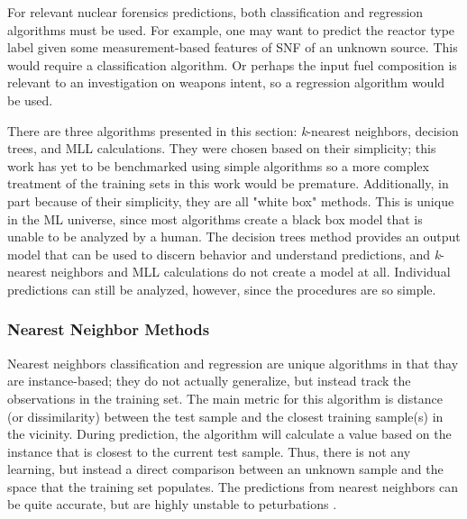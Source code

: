 \setlength\abovedisplayskip{2.5pt}

For relevant nuclear forensics predictions, both classification and regression
algorithms must be used.  For example, one may want to predict the reactor type
label given some measurement-based features of \gls{SNF} of an unknown source.
This would require a classification algorithm. Or perhaps the input fuel
composition is relevant to an investigation on weapons intent, so a regression
algorithm would be used. 

There are three algorithms presented in this section: \textit{k}-nearest
neighbors, decision trees, and \gls{MLL} calculations. They were chosen based
on their simplicity; this work has yet to be benchmarked using simple
algorithms so a more complex treatment of the training sets in this work would
be premature. Additionally, in part because of their simplicity, they are all
"white box" methods.  This is unique in the \gls{ML} universe, since most
algorithms create a black box model that is unable to be analyzed by a human.
The  decision trees method provides an output model that can be used to discern
behavior and understand predictions, and \textit{k}-nearest neighbors and
\gls{MLL} calculations do not create a model at all. Individual predictions can
still be analyzed, however, since the procedures are so simple. 

\subsubsection{Nearest Neighbor Methods}

Nearest neighbors classification and regression are unique algorithms in
that thay are instance-based; they do not actually generalize, but instead
track the observations in the training set.  The main metric for this algorithm
is distance (or dissimilarity) between the test sample and the closest training
sample(s) in the vicinity.  During prediction, the algorithm will calculate a
value based on the instance that is closest to the current test sample. Thus,
there is not any learning, but instead a direct comparison between an unknown
sample and the space that the training set populates. The predictions from
nearest neighbors can be quite accurate, but are highly unstable to
peturbations \cite{elements_stats}.

